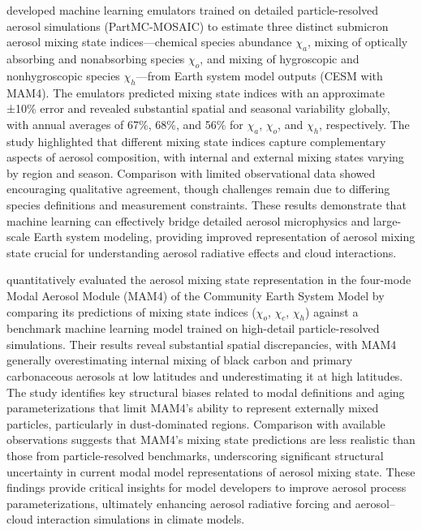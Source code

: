 \documentclass[11pt]{article}
\begin{document}
\citet{zheng2021estimating} developed machine learning emulators trained on detailed particle-resolved aerosol simulations (PartMC-MOSAIC) to estimate three distinct submicron aerosol mixing state indices—chemical species abundance $\chi_a$, mixing of optically absorbing and nonabsorbing species $\chi_o$, and mixing of hygroscopic and nonhygroscopic species $\chi_h$—from Earth system model outputs (CESM with MAM4). The emulators predicted mixing state indices with an approximate ±10\% error and revealed substantial spatial and seasonal variability globally, with annual averages of 67\%, 68\%, and 56\% for $\chi_a$, $\chi_o$, and $\chi_h$, respectively. The study highlighted that different mixing state indices capture complementary aspects of aerosol composition, with internal and external mixing states varying by region and season. Comparison with limited observational data showed encouraging qualitative agreement, though challenges remain due to differing species definitions and measurement constraints. These results demonstrate that machine learning can effectively bridge detailed aerosol microphysics and large-scale Earth system modeling, providing improved representation of aerosol mixing state crucial for understanding aerosol radiative effects and cloud interactions.

\citet{zheng2021quantifying} quantitatively evaluated the aerosol mixing state representation in the four-mode Modal Aerosol Module (MAM4) of the Community Earth System Model by comparing its predictions of mixing state indices (\(\chi_o\), \(\chi_c\), \(\chi_h\)) against a benchmark machine learning model trained on high-detail particle-resolved simulations. Their results reveal substantial spatial discrepancies, with MAM4 generally overestimating internal mixing of black carbon and primary carbonaceous aerosols at low latitudes and underestimating it at high latitudes. The study identifies key structural biases related to modal definitions and aging parameterizations that limit MAM4’s ability to represent externally mixed particles, particularly in dust-dominated regions. Comparison with available observations suggests that MAM4’s mixing state predictions are less realistic than those from particle-resolved benchmarks, underscoring significant structural uncertainty in current modal model representations of aerosol mixing state. These findings provide critical insights for model developers to improve aerosol process parameterizations, ultimately enhancing aerosol radiative forcing and aerosol–cloud interaction simulations in climate models.
\end{document}
